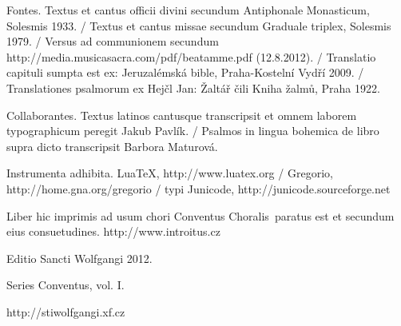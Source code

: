 \documentclass[a4paper, twoside, 12pt]{article}
\begin{document}

\vspace*{5cm}

Fontes. 
Textus et cantus officii divini secundum 
Antiphonale Monasticum, Solesmis 1933. /
Textus et cantus missae secundum
Graduale triplex, Solesmis 1979. /
Versus ad communionem secundum
http://media.musicasacra.com/pdf/beatamme.pdf (12.8.2012). /
Translatio capituli sumpta est ex:
Jeruzalémská bible, Praha-Kostelní Vydří 2009. /
Translationes psalmorum ex
Hejčl Jan: Žaltář čili Kniha žalmů, Praha 1922.

Collaborantes.
Textus latinos cantusque transcripsit et omnem laborem typographicum peregit
Jakub Pavlík. /
Psalmos in lingua bohemica de libro supra dicto transcripsit
Barbora Maturová.

Instrumenta adhibita.
LuaTeX, http://www.luatex.org / 
Gregorio, http://home.gna.org/gregorio /
typi Junicode, http://junicode.sourceforge.net

\begin{center}
Liber hic imprimis ad usum chori 
\guillemotright Conventus Choralis\guillemotleft\ 
paratus est
et secundum eius consuetudines.
http://www.introitus.cz

\vspace{1cm}

{\large Editio Sancti Wolfgangi 2012.}

\vspace{2mm}

Series \guillemotright Conventus\guillemotleft, vol. I.

\vspace{1cm}

http://stiwolfgangi.xf.cz

\end{center}

\vfill
\end{document}
